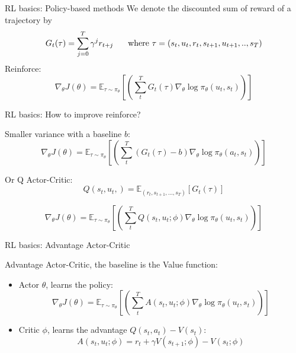 \documentclass[9pt, hyperref={pdfusetitle,colorlinks=true,allcolors=DarkBlue}]{beamer}
\begin{document}
\begin{frame}{RL basics: Policy-based methods}
\vfill
We denote the discounted sum of reward of a trajectory by 
\begin{equation*}
G_t(\tau)  = \sum_{j=0}^T \gamma^j r_{t+j} \hspace{.5cm} \text{ where } \tau = (s_t, u_t, r_t, s_{t+1}, u_{t+1},.., s_T)
\end{equation*}
\vfill
Reinforce:
\begin{equation*}
        \nabla_\theta J(\theta)  = \mathbb{E}_{\tau \sim \pi_\theta}\left[\left(  \sum_t^T G_t(\tau)  \nabla_\theta  \log \pi_\theta(u_t, s_t)  \right)\right] 
\end{equation*}


\end{frame}

\begin{frame}{RL basics: How to improve reinforce?}

Smaller variance with a baseline $b$:
\begin{equation*}
\nabla_\theta J(\theta)  = \mathbb{E}_{\tau \sim \pi_\theta}\left[ \left( \sum_t^T \left( G_t(\tau)-b \right) \nabla_\theta \log \pi_\theta(a_t, s_t) \right) \right] 
\end{equation*}

\vfill
 
Or Q Actor-Critic:
$$Q(s_t, u_t,) = \mathbb{E}_{(r_t, s_{t+1},...,s_T)}\left[G_t(\tau) \right]$$

$$\nabla_\theta J(\theta)  = \mathbb{E}_{\tau \sim \pi_\theta}\left[\left( \sum_t^T Q(s_t, u_t; \phi) \nabla_\theta  \log \pi_\theta(u_t, s_t) \right) \right] $$




\end{frame}

\begin{frame}{RL basics: Advantage Actor-Critic}

    
Advantage Actor-Critic, the baseline is the Value function:

\begin{itemize}
    \item Actor $\theta$, learns the policy:
    \vfill
    \begin{equation*}
         \nabla_\theta J(\theta)  = \mathbb{E}_{\tau \sim \pi_\theta}\left[ \left(\sum_t^T A(s_t, u_t; \phi) \nabla_\theta \log \pi_\theta(u_t, s_t)  \right) \right] 
    \end{equation*}
    \vfill
    \item Critic $\phi$, learns the advantage $Q(s_t, a_t) - V(s_t)$:
    \vfill
    \begin{equation*}
        A(s_t, u_t; \phi) = r_t + \gamma V(s_{t+1}; \phi) - V(s_t; \phi)
    \end{equation*}
\end{itemize}{}

\end{frame}
\end{document}
